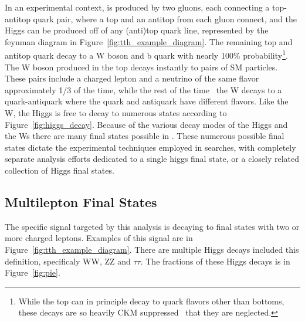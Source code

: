 In an experimental context, \tth is produced by two gluons, each connecting a top-antitop quark pair, where a top and an
antitop from each gluon connect, and the Higgs can be produced off of any (anti)top quark line, represented by the feynman diagram in Figure~\ref{fig:tth_example_diagram}.
The remaining top and antitop quark decay to a W boson and b quark with nearly 100$\%$ probability\footnote{While the top can in principle decay
to quark flavors other than bottoms, these decays are so heavily CKM suppressed~\cite{pdg} that they are
neglected.}. The W boson produced in the top decays instantly to pairs of SM particles. These pairs include a charged lepton and a neutrino of the same
flavor approximately 1/3 of the time, while the rest of the time~\cite{pdg} the W decays to a quark-antiquark where the quark and antiquark have different flavors. 
Like the W, the Higgs is free to decay to numerous states according to Figure~\ref{fig:higgs_decay}. Because of the various decay modes of the Higgs and
the Ws there are many final states possible in \tth. These numerous possible final states dictate the experimental techniques employed in searches,
with completely separate analysis efforts dedicated to a single \tth higgs final state, or a closely related collection of Higgs final states.


\subsection{Multilepton Final States}
The specific signal targeted by this analysis is \tth decaying to final states with two or more charged leptons. Examples of this signal are in
Figure~\ref{fig:tth_example_diagram}. There are multiple Higgs decays included this definition, specificaly WW, ZZ and $\tau\tau$. The fractions of these Higgs decays
is in Figure~\ref{fig:pie}. 

